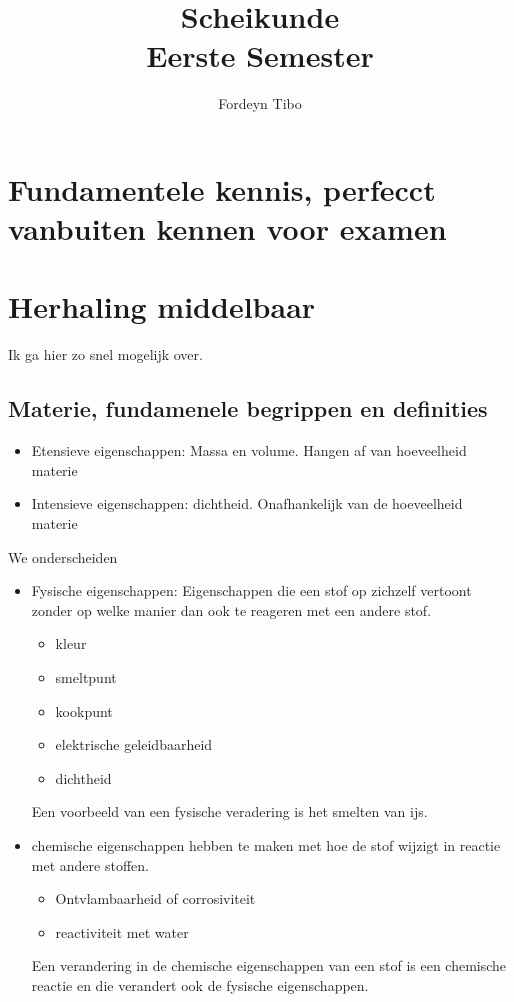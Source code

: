 \documentclass{report}
\title{\Huge{Scheikunde}\\Eerste Semester}
\author{\huge{Fordeyn Tibo}}
\date{}
\begin{document}
\maketitle


\newpage%
\tableofcontents
\pagebreak

\chapter{Fundamentele kennis, perfecct vanbuiten kennen voor examen}




\chapter{Herhaling middelbaar}
Ik ga hier zo snel mogelijk over.
\section{Materie, fundamenele begrippen en definities}

\begin{itemize}
	\item Etensieve eigenschappen: Massa en volume. Hangen af van hoeveelheid materie
	\item Intensieve eigenschappen: dichtheid. Onafhankelijk van de hoeveelheid materie 
\end{itemize}
We onderscheiden
\begin{itemize}
	\item Fysische eigenschappen: Eigenschappen die een stof op zichzelf vertoont zonder op welke manier dan ook te reageren met een andere stof. 
		\begin{itemize}
			\item kleur
			\item smeltpunt
			\item kookpunt
			\item elektrische geleidbaarheid
			\item dichtheid
		\end{itemize}
		Een voorbeeld van een fysische veradering is het smelten van ijs.
	\item chemische eigenschappen hebben te maken met hoe de stof wijzigt in reactie met andere stoffen.
		\begin{itemize}
			\item Ontvlambaarheid of corrosiviteit
			\item reactiviteit met water
		\end{itemize}
		Een verandering in de chemische eigenschappen van een stof is een chemische reactie en die verandert ook de fysische eigenschappen.
\end{itemize}
\end{document}
